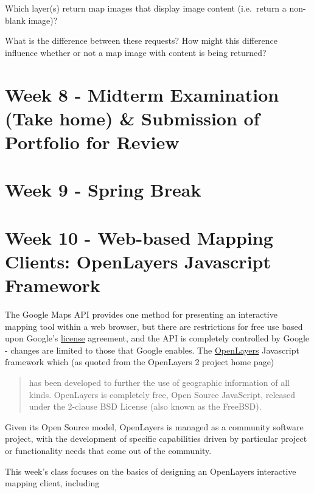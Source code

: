 \documentclass[]{book}
\providecommand{\tightlist}{%
  \setlength{\itemsep}{0pt}\setlength{\parskip}{0pt}}
\begin{document}
\begin{description}
\tightlist
\item[Question 6]
Which layer(s) return map images that display image content (i.e.~return
a non-blank image)?
\item[Questions 7]
What is the difference between these requests? How might this difference
influence whether or not a map image with content is being returned?
\end{description}

\chapter{Week 8 - Midterm Examination (Take home) \& Submission of
Portfolio for
Review}\label{week-8---midterm-examination-take-home-submission-of-portfolio-for-review}

\chapter{Week 9 - Spring Break}\label{week-9---spring-break}

\chapter{Week 10 - Web-based Mapping Clients: OpenLayers Javascript
Framework}\label{week10}

The Google Maps API provides one method for presenting an interactive
mapping tool within a web browser, but there are restrictions for free
use based upon Google's
\href{https://developers.google.com/maps/licensing}{license} agreement,
and the API is completely controlled by Google - changes are limited to
those that Google enables. The \href{http://openlayers.org/}{OpenLayers}
Javascript framework which (as quoted from the OpenLayers 2 project home
page)

\begin{quote}
has been developed to further the use of geographic information of all
kinds. OpenLayers is completely free, Open Source JavaScript, released
under the 2-clause BSD License (also known as the FreeBSD).
\end{quote}

Given its Open Source model, OpenLayers is managed as a community
software project, with the development of specific capabilities driven
by particular project or functionality needs that come out of the
community.

This week's class focuses on the basics of designing an OpenLayers
interactive mapping client, including
\end{document}
